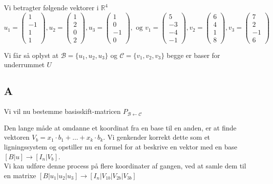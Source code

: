 \documentclass[11pt]{article}
\begin{document}
Vi betragter følgende vektorer i \(\mathbb{R}^4\)
\[ u_1 = \begin{pmatrix}1\\ -1\\ 1\\ 1 \end{pmatrix}, 
u_2 = \begin{pmatrix} 1\\ 2\\ 0\\ 2\end{pmatrix},
u_3 = \begin{pmatrix}1\\ 0\\ -1\\ 0\end{pmatrix}, \text{ og }
v_1 = \begin{pmatrix}5\\ -3\\ -4\\ -1\end{pmatrix},
v_2 = \begin{pmatrix}6\\ 4\\ 1\\ 8\end{pmatrix},
v_3 = \begin{pmatrix}7\\ 2\\ -1\\ 6\end{pmatrix}
\]

Vi får så oplyst at \(\mathcal{B} = \{u_1, u_2, u_3\}\) og
\(\mathcal{C} = \{v_1, v_2, v_3\}\) begge er baser for underrummet \(U\)

    \hypertarget{a2}{%
\subsection{A}\label{a2}}

Vi vil nu bestemme basisskift-matricen
\(P_{\mathcal{B}\leftarrow\mathcal{C}}\)

Den lange måde at omdanne et koordinat fra en base til en anden, er at
finde vektoren \(V_b = x_1\cdot b_1 + \dots + x_k\cdot b_k\). Vi
genkender korrekt dette som et ligningssystem og opstiller nu en formel
for at beskrive en vektor med en base \([B|u] \rightarrow [I_n|V_b]\).\\
Vi kan udføre denne process på flere koordinater af gangen, ved at samle
dem til en matrixe
\(\left[ B|u_1|u_2|u_3\right] \rightarrow \left[I_n|V_{1b}|V_{2b}|V_{3b}\right]\)
\end{document}
